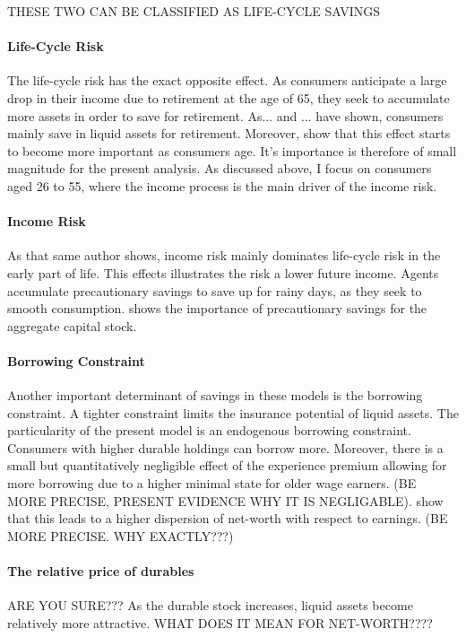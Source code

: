 \documentclass[a4paper,12pt]{article}
\begin{document}
THESE TWO CAN BE CLASSIFIED AS LIFE-CYCLE SAVINGS

\paragraph{Life-Cycle Risk} The life-cycle risk has the exact opposite effect. As consumers anticipate a large drop in their income due to retirement at the age of 65, they seek to accumulate more assets in order to save for retirement. As... and ... have shown, consumers mainly save in liquid assets for retirement. Moreover, \cite{Gourinchas&Parker2002} show that this effect starts to become more important as consumers age. It's importance is therefore of small magnitude for the present analysis. As discussed above, I focus on consumers aged 26 to 55, where the income process is the main driver of the income risk. 

\paragraph{Income Risk} As that same author shows, income risk mainly dominates life-cycle risk in the early part of life. This effects illustrates the risk  a lower future income. Agents accumulate precautionary savings to save up for rainy days, as they seek to smooth consumption. \cite{aiyagari1994} shows the importance of precautionary savings for the aggregate capital stock. 

\paragraph{Borrowing Constraint} Another important determinant of savings in these models is the borrowing constraint. A tighter constraint limits the insurance potential of liquid assets. The particularity of the present model is an endogenous borrowing constraint. Consumers with higher durable holdings can borrow more. Moreover, there is a small but quantitatively negligible effect of the experience premium allowing for more borrowing due to a higher minimal state for older wage earners. (BE MORE PRECISE, PRESENT EVIDENCE WHY IT IS NEGLIGABLE). \cite{FV&K2011} show that this leads to a higher dispersion of net-worth with respect to earnings. (BE MORE PRECISE. WHY EXACTLY???) 

\paragraph{The relative price of durables} ARE YOU SURE??? As the durable stock increases, liquid assets become relatively more attractive. WHAT DOES IT MEAN FOR NET-WORTH???? 
\end{document}
